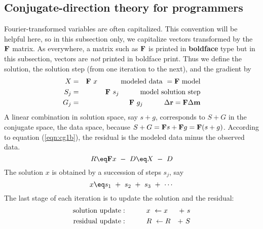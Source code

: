 \subsection{Conjugate-direction theory for programmers}
Fourier-transformed variables are often capitalized.
This convention will be helpful here,
so in this subsection only,
we capitalize vectors transformed by the  $\bold F$  matrix.
As everywhere, a matrix such as $\bold F$
is printed in {\bf boldface} type
but in this subsection,
vectors are {\it not} printed in boldface print.
Thus we define the solution, the solution step
(from one iteration to the next),
and the gradient by
\begin{eqnarray}
X   &=& \bold F \  x\   \quad\quad\quad  {\rm modeled\ data\ } = \bold F\ {\rm model}
\\
S_j &=& \bold F \  s_j  \quad\quad\quad  {\rm model\ solution\ step}    \\
G_j &=& \bold F \  g_j  \quad\quad\quad  \Delta\bold r = \bold F\Delta\bold m
\end{eqnarray}
A linear combination in solution space,
say  $s+g$,  corresponds to  $S+G$  in the conjugate space, the data space,
because $S+G = \bold F s + \bold F g = \bold F(s+g)$.
According to equation 
(\ref{eqn:cg1b}),
the residual is the modeled data minus the observed data.
\begin{equation}
R \eq \bold F  x \ -\ D
  \eq          X \ -\ D
\end{equation}
The solution  $x$  is obtained by a succession of steps  $s_j$, say
\begin{equation}
x \eq s_1 \ +\  s_2 \ +\  s_3 \ +\  \cdots
\end{equation}
The last stage of each iteration is to update the solution and the residual:
\begin{eqnarray}
\label{eqn:xupdate}
{\rm solution\ update:} \quad\quad\quad  & x \ \leftarrow  x&  +\  s\\
\label{eqn:Rupdate}
{\rm residual\ update:} \quad\quad\quad  & R \ \leftarrow  R&  +\  S
\end{eqnarray}

